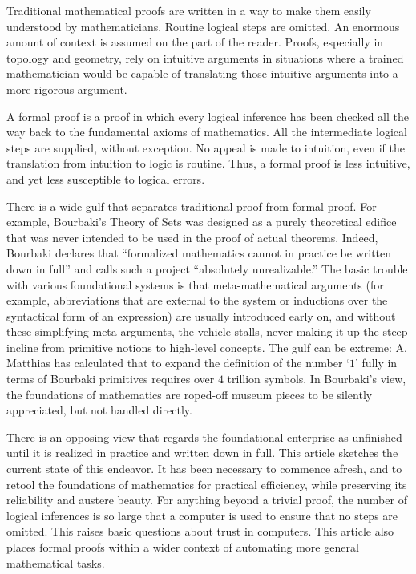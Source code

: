 \documentclass{llncs}
\begin{document}
Traditional mathematical proofs are written in a way to make them easily understood by mathematicians. Routine logical steps are omitted. An enormous amount of context is assumed on the part of the reader. Proofs, especially in topology and geometry, rely on intuitive arguments in situations where a trained mathematician would be capable of translating those intuitive arguments into a more rigorous argument.


A formal proof is a proof in which every logical inference has
been checked all the way back to the fundamental axioms of mathematics.
All the intermediate logical steps are supplied, without exception. No appeal is made to intuition, even if the translation from intuition to logic is routine. Thus, a formal proof is less intuitive, and yet less susceptible to logical errors.

There is a wide gulf that separates traditional proof from formal proof.
For example, Bourbaki's Theory of Sets was designed as a purely theoretical
edifice that was never intended to be used in the proof of actual theorems.
Indeed, Bourbaki declares that ``formalized mathematics cannot
in practice be written down in full'' and calls such a project
``absolutely unrealizable.''  %
The basic trouble with various foundational systems is that meta-mathematical arguments (for
example, abbreviations that are external to the system or
inductions over the syntactical form of an expression) 
are usually introduced early on, and without these simplifying meta-arguments,
the vehicle stalls, never making it up the steep incline from primitive notions to 
high-level concepts.   The gulf can be extreme: A. Matthias has calculated
that to expand the definition of the number `$1$' fully in terms of Bourbaki primitives requires
over $4$ trillion symbols.
In Bourbaki's view, 
the foundations of mathematics are roped-off museum pieces
to be silently appreciated, 
but not handled directly.

There is an opposing view that regards the 
foundational enterprise
as unfinished until it is realized in practice and written down in full.
This article sketches the current state of this endeavor.
It has been necessary to commence afresh, and to retool the foundations
of mathematics for practical efficiency, while preserving
its reliability and austere beauty.  For anything beyond a trivial
proof, the number of logical inferences is so large that a computer is
used to ensure that no steps are omitted.   This raises basic questions
about trust in computers.  This article also places formal proofs within
a wider context of automating more general mathematical tasks.
\end{document}
